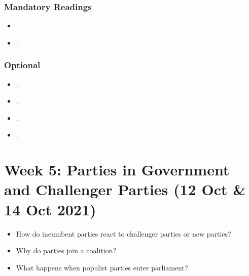 \documentclass[abstract=on,parskip=full,headings=standardclasses,fontsize=11pt,paper=a4]{scrartcl}
\begin{document}
\subsubsection*{Mandatory Readings}



\begin{itemize}
\item {}.
\item {}.
\end{itemize}



\subsubsection*{Optional}
\begin{itemize}
\item {}.
\item {}.
\item {}.
\item {}.
\end{itemize}







\section{Week 5: Parties in Government and Challenger Parties  (12 Oct \& 14 Oct 2021)}

\begin{itemize}
\renewcommand\labelitemi{--}
\item How do incumbent parties react to challenger parties or new parties?
\item Why do parties join a coalition? 
\item What happens when populist parties enter parliament?
\end{itemize}
\end{document}

